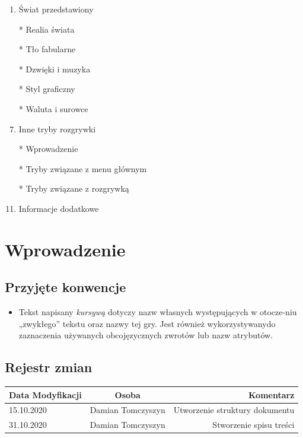 \documentclass{article}
\begin{document}
\begin{enumerate}
	\item Świat przedstawiony   
	    \item[*] Realia świata  
	    \item[*] Tło fabularne 
	    \item[*] Dzwięki i muzyka
        \item[*] Styl graficzny
	    \item[*] Waluta i surowce
	    
	    
	    
    \item  Inne tryby rozgrywki 
        \item[*] Wprowadzenie
	    \item[*] Tryby związane z menu głównym 
	    \item[*] Tryby związane z rozgrywką 

	\item  Informacje dodatkowe
	   
	\end{enumerate}
	
	
	
	
	
	\newpage
	
	
	
	
\section{Wprowadzenie}
    \subsection{Przyjęte konwencje}
\begin{itemize}
    \item Tekst napisany \emph{kursywą} dotyczy nazw własnych występujących w otocze-niu „zwykłego” tekstu oraz nazwy tej gry. Jest również wykorzystywanydo zaznaczenia używanych obcojęzycznych zwrotów lub nazw atrybutów.
\end{itemize}
    \subsection{Rejestr zmian}
\begin{tabular}{|l|c|r|}
	\hline
	Data Modyfikacji & Osoba & Komentarz\\
	\hline
	15.10.2020 & Damian Tomczyszyn & Utworzenie struktury dokumentu\\
	\hline
	31.10.2020 & Damian Tomczyszyn & Stworzenie spisu treści \\
	\hline
\end{tabular}
\end{document}
